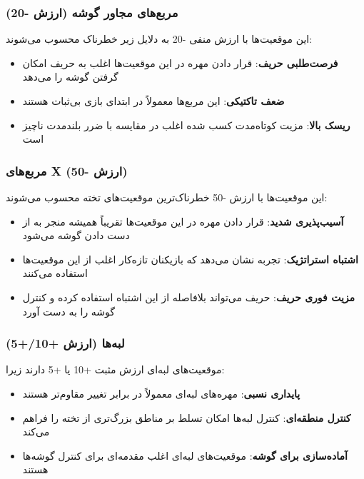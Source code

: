 \documentclass[12pt]{article}
\begin{document}
	\subsubsection{مربع‌های مجاور گوشه (ارزش -20)}
	
	این موقعیت‌ها با ارزش منفی -20 به دلایل زیر خطرناک محسوب می‌شوند:
	
	\begin{itemize}
		\item \textbf{فرصت‌طلبی حریف}: قرار دادن مهره در این موقعیت‌ها اغلب به حریف امکان گرفتن گوشه را می‌دهد
		\item \textbf{ضعف تاکتیکی}: این مربع‌ها معمولاً در ابتدای بازی بی‌ثبات هستند
		\item \textbf{ریسک بالا}: مزیت کوتاه‌مدت کسب شده اغلب در مقایسه با ضرر بلندمدت ناچیز است
	\end{itemize}
	
	\subsubsection{مربع‌های X (ارزش -50)}
	
	این موقعیت‌ها با ارزش -50 خطرناک‌ترین موقعیت‌های تخته محسوب می‌شوند:
	
	\begin{itemize}
		\item \textbf{آسیب‌پذیری شدید}: قرار دادن مهره در این موقعیت‌ها تقریباً همیشه منجر به از دست دادن گوشه می‌شود
		\item \textbf{اشتباه استراتژیک}: تجربه نشان می‌دهد که بازیکنان تازه‌کار اغلب از این موقعیت‌ها استفاده می‌کنند
		\item \textbf{مزیت فوری حریف}: حریف می‌تواند بلافاصله از این اشتباه استفاده کرده و کنترل گوشه را به دست آورد
	\end{itemize}
	
	\subsubsection{لبه‌ها (ارزش +10/+5)}
	
	موقعیت‌های لبه‌ای ارزش مثبت +10 یا +5 دارند زیرا:
	
	\begin{itemize}
		\item \textbf{پایداری نسبی}: مهره‌های لبه‌ای معمولاً در برابر تغییر مقاوم‌تر هستند
		\item \textbf{کنترل منطقه‌ای}: کنترل لبه‌ها امکان تسلط بر مناطق بزرگ‌تری از تخته را فراهم می‌کند
		\item \textbf{آماده‌سازی برای گوشه}: موقعیت‌های لبه‌ای اغلب مقدمه‌ای برای کنترل گوشه‌ها هستند
	\end{itemize}
	
\end{document}
